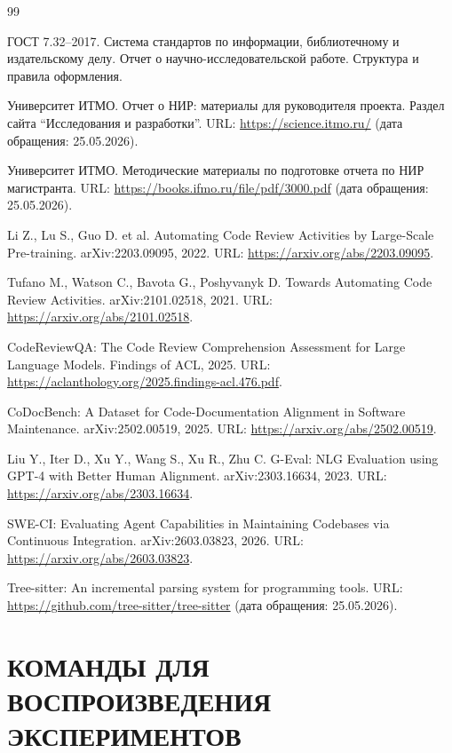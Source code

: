 \documentclass[14pt,a4paper]{extreport}
\begin{document}
\begin{thebibliography}{99}

ГОСТ 7.32--2017. Система стандартов по информации, библиотечному и
издательскому делу. Отчет о научно-исследовательской работе. Структура и
правила оформления.

Университет ИТМО. Отчет о НИР: материалы для руководителя проекта.
Раздел сайта ``Исследования и разработки''. URL:
\url{https://science.itmo.ru/} (дата обращения: 25.05.2026).

Университет ИТМО. Методические материалы по подготовке отчета по НИР
магистранта. URL: \url{https://books.ifmo.ru/file/pdf/3000.pdf}
(дата обращения: 25.05.2026).

Li Z., Lu S., Guo D. et al. Automating Code Review Activities by
Large-Scale Pre-training. arXiv:2203.09095, 2022.
URL: \url{https://arxiv.org/abs/2203.09095}.

Tufano M., Watson C., Bavota G., Poshyvanyk D. Towards Automating Code Review
Activities. arXiv:2101.02518, 2021.
URL: \url{https://arxiv.org/abs/2101.02518}.

CodeReviewQA: The Code Review Comprehension Assessment for Large Language
Models. Findings of ACL, 2025. URL:
\url{https://aclanthology.org/2025.findings-acl.476.pdf}.

CoDocBench: A Dataset for Code-Documentation Alignment in Software Maintenance.
arXiv:2502.00519, 2025. URL: \url{https://arxiv.org/abs/2502.00519}.

Liu Y., Iter D., Xu Y., Wang S., Xu R., Zhu C. G-Eval: NLG Evaluation using
GPT-4 with Better Human Alignment. arXiv:2303.16634, 2023.
URL: \url{https://arxiv.org/abs/2303.16634}.

SWE-CI: Evaluating Agent Capabilities in Maintaining Codebases via Continuous
Integration. arXiv:2603.03823, 2026.
URL: \url{https://arxiv.org/abs/2603.03823}.

Tree-sitter: An incremental parsing system for programming tools.
URL: \url{https://github.com/tree-sitter/tree-sitter}
(дата обращения: 25.05.2026).

\end{thebibliography}

\appendix

\chapter{КОМАНДЫ ДЛЯ ВОСПРОИЗВЕДЕНИЯ ЭКСПЕРИМЕНТОВ}
\end{document}
